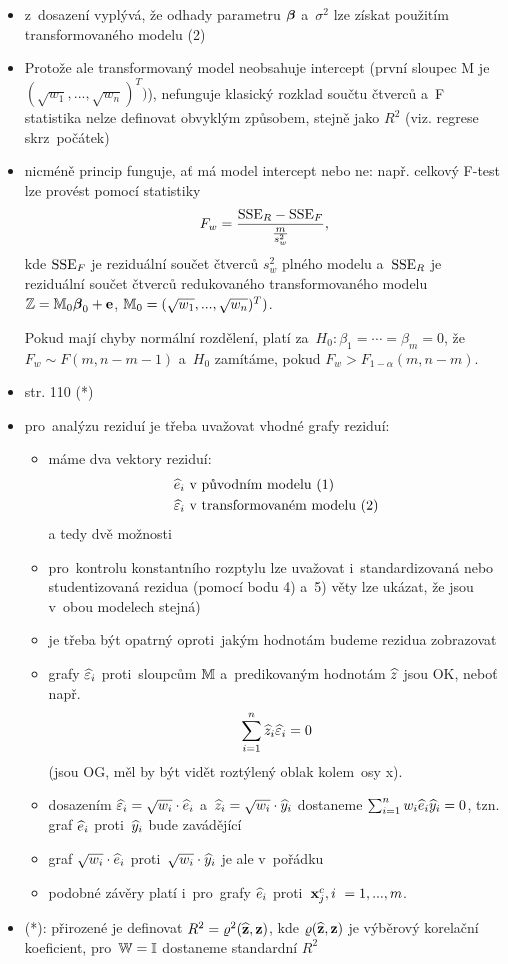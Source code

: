 \begin{itemize}
	\item z~dosazení vyplývá, že odhady parametru $\boldsymbol{\beta}$ a~$\sigma^2$ lze získat použitím transformovaného modelu (2)
	\item Protože ale transformovaný model neobsahuje intercept (první sloupec M je $(\sqrt{w_1},..., \sqrt{w_n})^T)$), nefunguje klasický rozklad součtu čtverců a~F statistika nelze definovat obvyklým způsobem, stejně jako $R^2$ (viz. regrese skrz~počátek)
	\item nicméně princip  funguje, ať má model intercept nebo ne:
	např. celkový F-test lze provést pomocí statistiky
	 $$
	F_w = \frac{\mathrm{SSE}_R - \mathrm{SSE}_F}{\frac{m}{s_w^2}},
	 $$
	kde $\mathrm{SSE}_F$ je reziduální součet čtverců $s_w^2$ plného modelu a~$\mathrm{SSE}_R$ je reziduální součet čtverců redukovaného transformovaného modelu $\mathbb{Z} = \mathbb{M}_0 \boldsymbol{\beta}_0 + \textbf{e}$, $\mathbb{M}_0 = (\sqrt{w_1},..., \sqrt{w_n})^T)$.
	
	Pokud mají chyby normální rozdělení, platí za~$H_0: \beta_1 = \cdots = \beta_m = 0$, že $F_w \sim F(m, n-m-1)$ a~$H_0$ zamítáme, pokud $F_w > F_{1-\alpha}(m,n-m)$.
	\item str. 110 (*)
	\item pro~analýzu reziduí je třeba uvažovat vhodné grafy reziduí:
	\begin{itemize}
		\item máme dva vektory reziduí:
		\begin{align*}
			& \widehat{e}_i \text{ v~původním modelu (1)} \\
			& \widehat{\varepsilon}_i \text{ v~transformovaném modelu (2)}
		\end{align*}
		a tedy dvě možnosti
		\item pro~kontrolu konstantního rozptylu lze uvažovat i~standardizovaná nebo studentizovaná rezidua (pomocí bodu 4) a~5) věty lze ukázat, že jsou v~obou modelech stejná)
		\item je třeba být opatrný oproti~jakým hodnotám budeme rezidua zobrazovat
		\item grafy $\widehat{\varepsilon}_i$ proti~sloupcům $\mathbb{M}$ a~predikovaným hodnotám $\widehat{z}$ jsou OK, neboť např.
		 $$
		\sum_{i = 1}^n \widehat{z}_i \widehat{\varepsilon}_i = 0
		 $$
		(jsou OG, měl by být vidět roztýlený oblak kolem~osy x).
		\item dosazením $\widehat{\varepsilon}_i = \sqrt{w_i}  \cdot \widehat{e}_i$ a~$\widehat{z}_i = \sqrt{w_i} \cdot \widehat{y}_i$ dostaneme $\sum_{i = 1}^n w_i \widehat{e}_i \widehat{y}_i = 0$, tzn. graf $\widehat{e}_i$ proti~$\widehat{y}_i$ bude zavádějící
		\item graf $\sqrt{w_i}  \cdot \widehat{e}_i$ proti~$\sqrt{w_i}  \cdot \widehat{y}_i$ je ale v~pořádku
		\item podobné závěry platí i~pro~grafy $\widehat{e}_i$ proti~$\textbf{x}_j^c, i~ = 1,..., m$.
 	\end{itemize}
 	\item (*): přirozené je definovat $R^2 = \varrho^2(\widehat{\textbf{z}}, \textbf{z})$, kde $\varrho(\widehat{\textbf{z}}, \textbf{z})$ je výběrový korelační koeficient, pro~$\mathbb{W} = \mathbb{I}$ dostaneme standardní $R^2$
\end{itemize}

